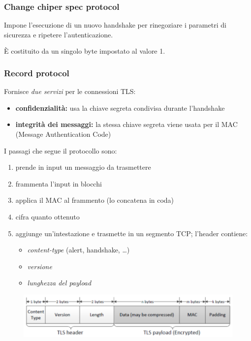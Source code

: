 \subsubsection{Change chiper spec protocol}
Impone l'esecuzione di un nuovo handshake per rinegoziare i parametri di sicurezza 
e ripetere l'autenticazione. 

\noindent È costituito da un singolo byte impostato al valore 1.

\subsubsection{Record protocol}
Fornisce \textit{due servizi} per le connessioni TLS:
\begin{itemize}
    \item \textbf{confidenzialità:} usa la chiave segreta condivisa durante l'handshake
    \item \textbf{integrità dei messaggi:} la stessa chiave segreta viene usata per il MAC (Message 
    Authentication Code)
\end{itemize}

I passagi che segue il protocollo sono:
\begin{enumerate}
    \item prende in input un messaggio da trasmettere 
    \item frammenta l'input in blocchi 
    \item applica il MAC al frammento (lo concatena in coda)
    \item cifra quanto ottenuto 
    \item aggiunge un'intestazione e trasmette in un segmento TCP; l'header contiene:
    \begin{itemize}
        \item \textit{content-type} (alert, handshake, \dots)
        \item \textit{versione}
        \item \textit{lunghezza del payload}
    \end{itemize}
\end{enumerate}

\begin{figure}[H]
    \centering
    \includegraphics[width=1\linewidth]{chapters/10/images/tls-record.png}
\end{figure}


